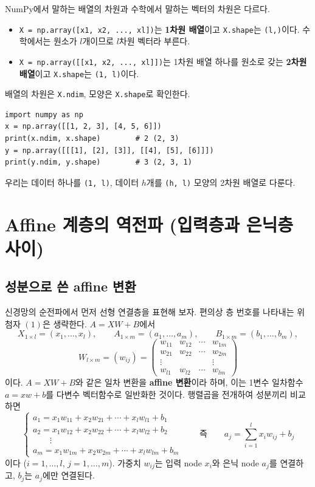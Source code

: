 \documentclass[11pt,a4paper]{article}
\begin{document}
\begin{remarkbox}
NumPy에서 말하는 배열의 차원과 수학에서 말하는 벡터의 차원은 다르다.
\begin{itemize}[leftmargin=1.8em]
\item \texttt{X = np.array([x1, x2, ..., xl])}는 \textbf{1차원 배열}이고
\texttt{X.shape}는 \texttt{(l,)}이다. 수학에서는 원소가 $l$개이므로 $l$차원 벡터라 부른다.
\item \texttt{X = np.array([[x1, x2, ..., xl]])}는 1차원 배열 하나를 원소로 갖는
\textbf{2차원 배열}이고 \texttt{X.shape}는 \texttt{(1, l)}이다.
\end{itemize}
배열의 차원은 \texttt{X.ndim}, 모양은 \texttt{X.shape}로 확인한다.
\begin{lstlisting}
import numpy as np
x = np.array([[1, 2, 3], [4, 5, 6]])
print(x.ndim, x.shape)        # 2 (2, 3)
y = np.array([[[1], [2], [3]], [[4], [5], [6]]])
print(y.ndim, y.shape)        # 3 (2, 3, 1)
\end{lstlisting}
우리는 데이터 하나를 \texttt{(1, l)}, 데이터 $h$개를 \texttt{(h, l)} 모양의 2차원 배열로 다룬다.
\end{remarkbox}

\section{Affine 계층의 역전파 (입력층과 은닉층 사이)}

\subsection{성분으로 쓴 affine 변환}

신경망의 순전파에서 먼저 선형 연결층을 표현해 보자.
편의상 층 번호를 나타내는 위첨자 $(1)$은 생략한다. $A=XW+B$에서
\[
X_{1\times l}=(x_1,\ldots,x_l),
\qquad
A_{1\times m}=(a_1,\ldots,a_m),
\qquad
B_{1\times m}=(b_1,\ldots,b_m),
\]
\[
W_{l\times m}=(w_{ij})=
\begin{pmatrix}
w_{11}&w_{12}&\cdots&w_{1m}\\
w_{21}&w_{22}&\cdots&w_{2m}\\
\vdots&&&\vdots\\
w_{l1}&w_{l2}&\cdots&w_{lm}
\end{pmatrix}
\]
이다.
$A=XW+B$와 같은 일차 변환을 \textbf{affine 변환}이라 하며,
이는 1변수 일차함수 $a=xw+b$를 다변수 벡터함수로 일반화한 것이다.
행렬곱을 전개하여 성분끼리 비교하면
\[
\begin{cases}
a_1=x_1w_{11}+x_2w_{21}+\cdots+x_lw_{l1}+b_1\\
a_2=x_1w_{12}+x_2w_{22}+\cdots+x_lw_{l2}+b_2\\
\qquad\vdots\\
a_m=x_1w_{1m}+x_2w_{2m}+\cdots+x_lw_{lm}+b_m
\end{cases}
\qquad\text{즉}\qquad
\boxed{a_j=\sum_{i=1}^{l}x_iw_{ij}+b_j}
\tag{1}
\]
이다 ($i=1,\ldots,l$, $j=1,\ldots,m$).
가중치 $w_{ij}$는 입력 node $x_i$와 은닉 node $a_j$를 연결하고, $b_j$는 $a_j$에만 연결된다.
\end{document}
